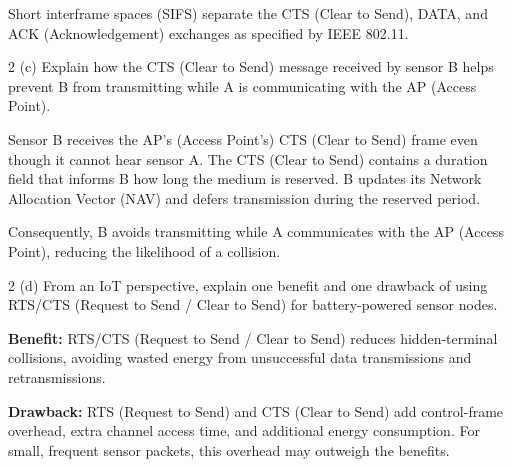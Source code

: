 Short interframe spaces (SIFS) separate the CTS (Clear to Send), DATA, and ACK (Acknowledgement) exchanges as
specified by IEEE 802.11.



\newpage
\begin{question}{2 (c)}
Explain how the CTS (Clear to Send) message received by sensor B helps prevent B from transmitting while A is
communicating with the AP (Access Point).
\end{question}

Sensor B receives the AP's (Access Point's) CTS (Clear to Send) frame even though it cannot hear sensor A. The CTS
(Clear to Send) contains a duration field that informs B how long the medium is reserved. B updates its Network
Allocation Vector (NAV) and defers transmission during the reserved period.

Consequently, B avoids transmitting while A communicates with the AP (Access Point), reducing the likelihood of a
collision.


\newpage
\begin{question}{2 (d)}
From an IoT perspective, explain one benefit and one drawback of using RTS/CTS (Request to Send
/ Clear to Send) for battery-powered sensor nodes.
\end{question}

\textbf{Benefit:} RTS/CTS (Request to Send / Clear to Send) reduces hidden-terminal collisions, avoiding wasted
energy from unsuccessful data transmissions and retransmissions.

\textbf{Drawback:} RTS (Request to Send) and CTS (Clear to Send) add control-frame overhead, extra channel access
time, and additional energy consumption. For small, frequent sensor packets, this overhead may outweigh the
benefits.

